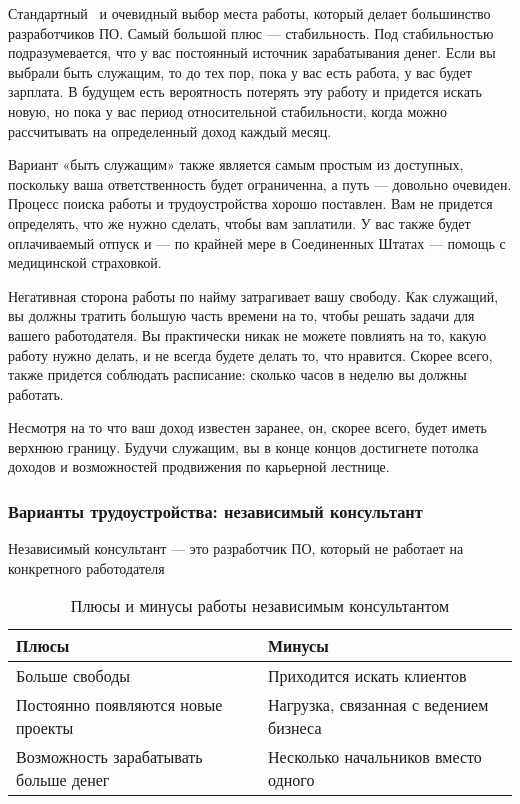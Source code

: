 \documentclass{../industrial-development}
\begin{document}
\lecturenotes

Стандартный~\cite[с.~62--67]{Sonmez} и очевидный выбор места работы, который делает большинство разработчиков ПО. 
Самый большой плюс — стабильность. Под стабильностью подразумевается, что у вас постоянный источник зарабатывания денег. Если вы выбрали быть служащим, то до тех пор, пока у вас есть работа, у вас будет зарплата. В будущем есть вероятность  потерять эту работу и придется искать новую, но пока у вас период относительной стабильности, когда можно рассчитывать на определенный доход каждый месяц.

Вариант «быть служащим» также является самым простым из доступных, поскольку ваша ответственность будет ограниченна, а путь — довольно очевиден. Процесс поиска работы и трудоустройства хорошо поставлен. Вам не придется определять, что же нужно сделать, чтобы вам заплатили. У вас также будет оплачиваемый отпуск и — по крайней мере в Соединенных Штатах — помощь с медицинской страховкой.

Негативная сторона работы по найму затрагивает вашу свободу. Как служащий, вы должны тратить большую часть времени на то, чтобы решать задачи для вашего работодателя. Вы практически никак не можете повлиять на то, какую работу нужно делать, и не всегда будете делать то, что нравится. Скорее всего, также придется соблюдать расписание: сколько часов в неделю вы должны работать.

Несмотря на то что ваш доход известен заранее, он, скорее всего, будет иметь верхнюю границу. Будучи служащим, вы в конце концов достигнете потолка доходов и возможностей продвижения по карьерной лестнице.


\begin{frame} \frametitle{Варианты трудоустройства: независимый консультант}
  \begin{block}{}
    Независимый консультант --- это разработчик ПО, который не работает на конкретного работодателя 
  \end{block}
  
   \begin{table}[H]
\caption{\label{tab:canonsummary} Плюсы и минусы работы независимым консультантом }
\begin{center}
\begin{tabular}{|p{0.5\linewidth}|p{0.5\linewidth}|}
\hline
\textbf{Плюсы} & \textbf{Минусы} \\
\hline
Больше свободы &  Приходится искать клиентов \\
\hline
Постоянно появляются новые проекты  & Нагрузка, связанная с ведением бизнеса \\
\hline
Возможность зарабатывать больше денег & Несколько начальников вместо одного \\
\hline
\end{tabular}
\end{center}
\end{table} 
\end{frame}
\end{document}
